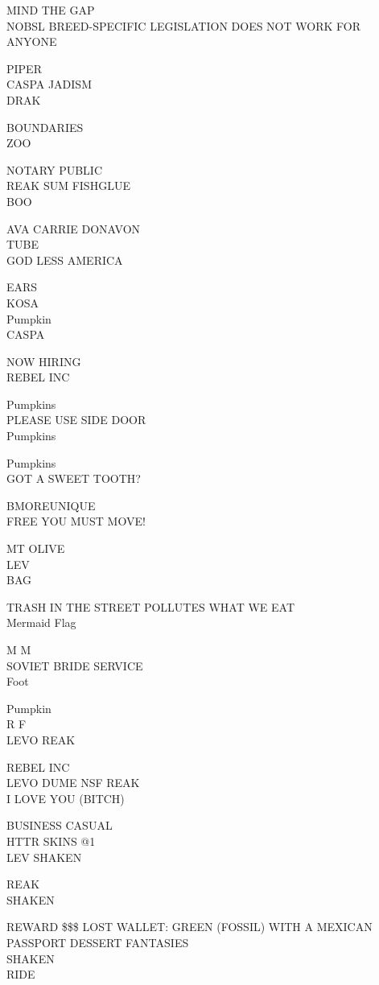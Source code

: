 \documentclass[10pt,letterpaper]{article}
\begin{document}
MIND THE GAP\\
NOBSL BREED{-}SPECIFIC LEGISLATION DOES NOT WORK FOR ANYONE

PIPER\\
CASPA JADISM\\
DRAK

BOUNDARIES\\
ZOO

NOTARY PUBLIC\\
REAK SUM FISHGLUE\\
BOO

AVA CARRIE DONAVON\\
TUBE\\
GOD LESS AMERICA

EARS\\
KOSA\\
Pumpkin\\
CASPA

NOW HIRING\\
REBEL INC

Pumpkins\\
PLEASE USE SIDE DOOR\\
Pumpkins

Pumpkins\\
GOT A SWEET TOOTH?

BMOREUNIQUE\\
FREE YOU MUST MOVE!

MT OLIVE\\
LEV\\
BAG

TRASH IN THE STREET POLLUTES WHAT WE EAT\\
Mermaid Flag

M M\\
SOVIET BRIDE SERVICE\\
Foot

Pumpkin\\
R F\\
LEVO REAK

REBEL INC\\
LEVO DUME NSF REAK\\
I LOVE YOU (BITCH)

BUSINESS CASUAL\\
HTTR SKINS @1\\
LEV SHAKEN

REAK\\
SHAKEN

REWARD \$\$\$ LOST WALLET: GREEN (FOSSIL) WITH A MEXICAN PASSPORT DESSERT FANTASIES\\
SHAKEN\\
RIDE
\end{document}
